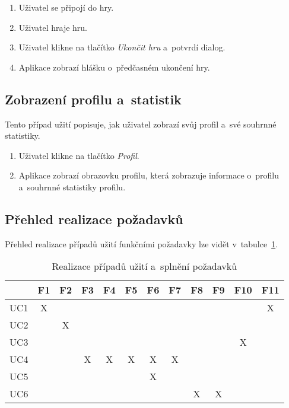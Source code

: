\begin{enumerate}
    \item Uživatel se připojí do hry.
    \item Uživatel hraje hru.
    \item Uživatel klikne na tlačítko \emph{Ukončit hru}
    a~potvrdí dialog.
    \item Aplikace zobrazí hlášku o~předčasném ukončení hry.
\end{enumerate}

\subsection{Zobrazení profilu a~statistik}

Tento případ užití popisuje,
jak uživatel zobrazí svůj profil a~své souhrnné statistiky.

\begin{enumerate}
    \item Uživatel klikne na tlačítko \emph{Profil}.
    \item Aplikace zobrazí obrazovku profilu,
    která zobrazuje informace o~profilu a~souhrnné statistiky profilu.
\end{enumerate}

\let\thesubsection=\oldsubsection

\subsection{Přehled realizace požadavků}

Přehled realizace případů užití funkčními požadavky lze vidět
v~tabulce~\ref{tab:use-case-requirements}.

\begin{table}[h!]
    \centering
    \begin{tabular}{c||c|c|c|c|c|c|c|c|c|c|c} 
        & F1 & F2 & F3 & F4 & F5 & F6 & F7 & F8 & F9 & F10 & F11 \\\hline\hline
        UC1 & X &   &   &   &   &   &   &   &   &   & X \\\hline %
        UC2 &   & X &   &   &   &   &   &   &   &   &   \\\hline %
        UC3 &   &   &   &   &   &   &   &   &   & X &   \\\hline %
        UC4 &   &   & X & X & X & X & X &   &   &   &   \\\hline %
        UC5 &   &   &   &   &   & X &   &   &   &   &   \\\hline %
        UC6 &   &   &   &   &   &   &   & X & X &   &   \\ %
    \end{tabular}
    \caption{Realizace případů užití a~splnění požadavků}
    \label{tab:use-case-requirements}
\end{table}
